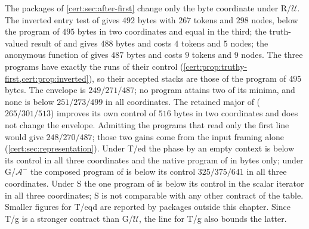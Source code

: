 The packages of \cref{cert:sec:after-first} change only the byte coordinate
under R/$\mathcal U$. The inverted entry test of 
gives $492$ bytes with $267$ tokens and $298$ nodes, below the program of
$495$ bytes in two coordinates and equal in the third; the truth-valued
result of  and  gives $488$
bytes and costs $4$ tokens and $5$ nodes; the anonymous function of
 gives $487$ bytes and costs $9$ tokens and $9$ nodes. The
three programs have exactly the runs of their control
(\cref{cert:prop:truthy-first,cert:prop:inverted}), so their accepted stacks
are those of the program of $495$ bytes. The envelope is $249/271/487$; no
program attains two of its minima, and none is below $251/273/499$ in all
coordinates. The retained major of  ($265/301/513$)
improves its own control of $516$ bytes in two coordinates and does not
change the envelope. Admitting the programs that read only the first line
would give $248/270/487$; those two gains come from the input framing alone
(\cref{cert:sec:representation}). Under T/ed the phase by an empty context is
below its control in all three coordinates and the native program of
 in bytes only; under G/$\mathcal A^{-}$ the composed
program of  is below its control $325/375/641$ in
all three coordinates. Under S the one program of  is
below its control in the scalar iterator in all three coordinates; S is not
comparable with any other contract of the table. Smaller figures for T/eqd are
reported by packages outside this chapter. Since T/g is a stronger contract
than G/$\mathcal U$, the line for T/g also bounds the latter.

